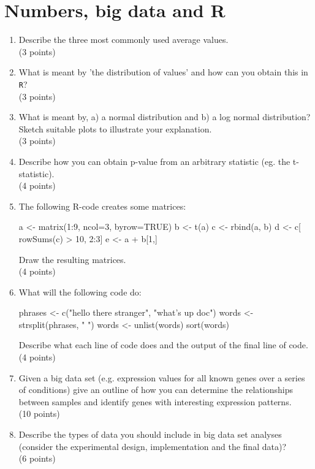 \documentclass[11pt]{article}
\begin{document}
\section{Numbers, big data and R}
\begin{enumerate}
\item Describe the three most commonly used average values.\\
  (3 points)
\item What is meant by 'the distribution of values' and how can you obtain
  this in \texttt{R}?\\
  (3 points)
\item What is meant by, a) a normal distribution and b) a log normal
  distribution? Sketch suitable plots to illustrate your explanation.\\
  (3 points)
\item Describe how you can obtain p-value from an arbitrary statistic (eg.
  the t-statistic).\\
  (4 points)
\item The following R-code creates some matrices:

  \begin{rcode}
    a <- matrix(1:9, ncol=3, byrow=TRUE)
    b <- t(a)
    c <- rbind(a, b)
    d <- c[ rowSums(c) > 10, 2:3]
    e <- a + b[1,]
  \end{rcode}
  Draw the resulting matrices.\\
  (4 points)
\item What will the following code do:

  \begin{rcode}
    phrases <- c("hello there stranger", "what's up doc")
    words <- strsplit(phrases, " ")
    words <- unlist(words)
    sort(words)
  \end{rcode}
  Describe what each line of code does and the output of the
  final line of code.\\
  (4 points)
\item Given a big data set (e.g. expression values for all
  known genes over a series of conditions) give an outline of
  how you can determine the relationships between samples
  and identify genes with interesting expression patterns.\\
  (10 points)
\item Describe the types of data you should include in big data set
  analyses (consider the experimental design, implementation and
  the final data)?\\
  (6 points)
\end{enumerate}
\end{document}

